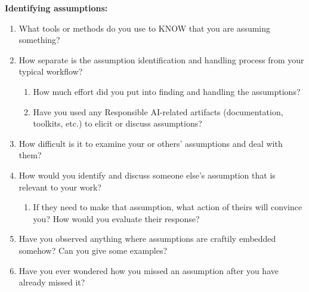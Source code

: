 \smallskip
\noindent \textbf{Identifying assumptions:}
\begin{enumerate}
    \item What tools or methods do you use to KNOW that you are assuming something?
    \item How separate is the assumption identification and handling process from your typical workflow?
    \begin{enumerate}
        \item How much effort did you put into finding and handling the assumptions?
        \item Have you used any Responsible AI-related artifacts (documentation, toolkits, etc.) to elicit or discuss assumptions? 
    \end{enumerate}
    \item How difficult is it to examine your or others’ assumptions and deal with them?
    \item How would you identify and discuss someone else’s assumption that is relevant to your work?
    \begin{enumerate}
        \item If they need to make that assumption, what action of theirs will convince you? How would you evaluate their response?
    \end{enumerate}
    \item Have you observed anything where assumptions are craftily embedded somehow? Can you give some examples?
    \item Have you ever wondered how you missed an assumption after you have already missed it?
\end{enumerate}

